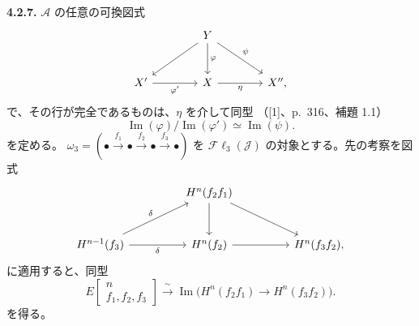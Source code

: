 \medskip\noindent\textbf{4.2.7.}
$\mathcal A$ の任意の可換図式
\[
\begin{tikzcd}[column sep=4em,row sep=2.7em]
&Y\arrow[dl]\arrow[d,"\varphi"]\arrow[dr,"\psi"]&\\
X'\arrow[r,"\varphi'"']&X\arrow[r,"\eta"']&X'',
\end{tikzcd}
\]
で、その行が完全であるものは、$\eta$ を介して同型
（[1]、p.~316、補題 1.1）
\[
\operatorname{Im}(\varphi)\big/\operatorname{Im}(\varphi')
\simeq\operatorname{Im}(\psi).
\]
を定める。
$\omega_3=(\mathord\bullet\xrightarrow{f_1}\mathord\bullet
\xrightarrow{f_2}\mathord\bullet\xrightarrow{f_3}\mathord\bullet)$
を $\mathcal{F}\ell_3(\mathcal J)$ の対象とする。先の考察を図式
\[
\begin{tikzcd}[column sep=4.6em,row sep=2.8em]
&H^n(f_2f_1)\arrow[d]\arrow[dr]&\\
H^{n-1}(f_3)\arrow[ur,"\delta"]\arrow[r,"\delta"']&
H^n(f_2)\arrow[r]&H^n(f_3f_2),
\end{tikzcd}
\]
に適用すると、同型
\[
E\!\begin{bmatrix}n\\ f_1,f_2,f_3\end{bmatrix}
\xrightarrow{\ \sim\ }
\operatorname{Im}\bigl(H^n(f_2f_1)\longrightarrow H^n(f_3f_2)\bigr).
\tag{4.2.7.1}
\]
を得る。
\endgroup
